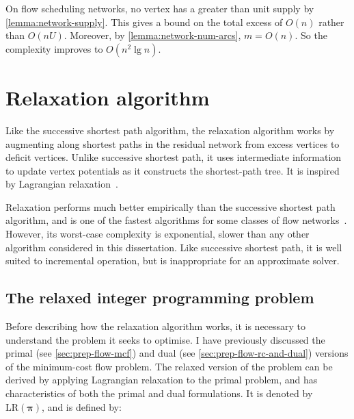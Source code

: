 \begin{remark}
On flow scheduling networks, no vertex has a greater than unit supply by \cref{lemma:network-supply}. This gives a bound on the total excess of $O(n)$ rather than $O(nU)$. Moreover, by \cref{lemma:network-num-arcs}, $m = O(n)$. So the complexity improves to $O(n^2 \lg n)$.
\end{remark}

\section{Relaxation algorithm} \label{sec:impl-relax}


Like the successive shortest path algorithm, the relaxation algorithm works by augmenting along shortest paths in the residual network from excess vertices to deficit vertices. Unlike successive shortest path, it uses intermediate information to update vertex potentials as it constructs the shortest-path tree. It is inspired by Lagrangian relaxation~\cite[ch.~16]{Ahuja:1993}\cite{Fisher:1981}.

Relaxation performs much better empirically than the successive shortest path algorithm, and is one of the fastest algorithms for some classes of flow networks~\cite{KiralyKovacs:2012}. However, its worst-case complexity is exponential, slower than any other algorithm considered in this dissertation\footnotemark. Like successive shortest path, it is well suited to incremental operation, but is inappropriate for an approximate solver.

\subsection{The relaxed integer programming problem}
Before describing how the relaxation algorithm works, it is necessary to understand the problem it seeks to optimise. I have previously discussed the primal (see \cref{sec:prep-flow-mcf}) and dual (see \cref{sec:prep-flow-rc-and-dual}) versions of the minimum-cost flow problem. The relaxed version of the problem can be derived by applying Lagrangian relaxation to the primal problem, and has characteristics of both the primal and dual formulations. It is denoted by $\mathrm{LR}(\boldsymbol{\pi})$, and is defined by:

